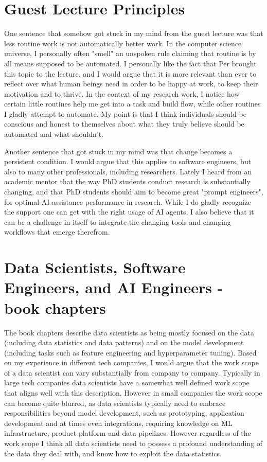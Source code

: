 \documentclass[11pt]{article}
\begin{document}
\section{Guest Lecture Principles} \label{ch:guest_lecture}

One sentence that somehow got stuck in my mind from the guest lecture was that less routine work is not automatically better work. In the computer science universe, I personally often "smell" an unspoken rule claiming that routine is by all means supposed to be automated. I personally like the fact that Per brought this topic to the lecture, and I would argue that it is more relevant than ever to reflect over what human beings need in order to be happy at work, to keep their motivation and to thrive. In the context of my research work, I notice how certain little routines help me get into a task and build flow, while other routines I gladly attempt to automate. My point is that I think individuals should be conscious and honest to themselves about what they truly believe should be automated and what shouldn't.

Another sentence that got stuck in my mind was that change becomes a persistent condition. I would argue that this applies to software engineers, but also to many other professionals, including researchers. Lately I heard from an academic mentor that the way PhD students conduct research is substantially changing, and that PhD students should aim to become great "prompt engineers", for optimal AI assistance performance in research. While I do gladly recognize the support one can get with the right usage of AI agents, I also believe that it can be a challenge in itself to integrate the changing tools and changing workflows that emerge therefrom.

\section{Data Scientists, Software Engineers, and AI Engineers - book chapters} \label{ch:book}

The book chapters \citep{Kastner2025Machine} describe data scientists as being mostly focused on the data (including data statistics and data patterns) and on the model development (including tasks such as feature engineering and hyperparameter tuning). Based on my experience in different tech companies, I would argue that the work scope of a data scientist can vary substantially from company to company. Typically in large tech companies data scientists have a somewhat well defined work scope that aligns well with this description. However in small companies the work scope can become quite blurred, as data scientists typically need to embrace responsibilities beyond model development, such as prototyping, application development and at times even integrations, requiring knowledge on ML infrastructure, product platform and data pipelines. However regardless of the work scope I think all data scientists need to possess a profound understanding of the data they deal with, and know how to exploit the data statistics.
\end{document}

